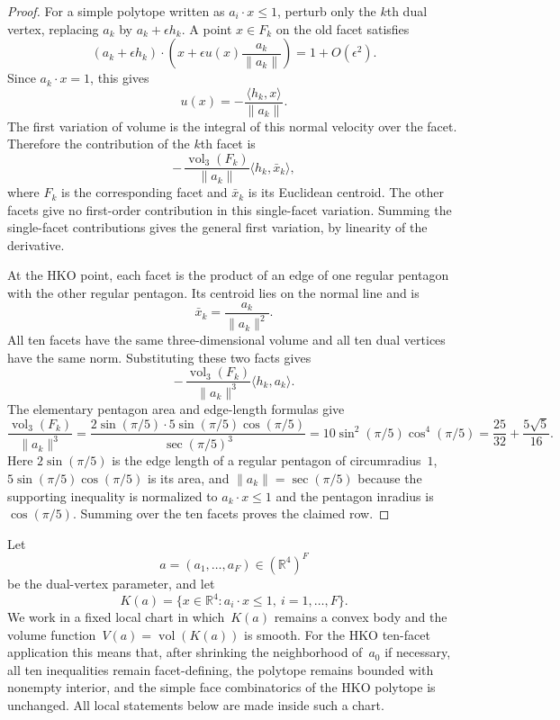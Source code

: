 \begin{proof}
For a simple polytope written as $a_i\cdot x\leq1$, perturb only the
$k$th dual vertex, replacing $a_k$ by $a_k+\epsilon h_k$.  A point
$x\in F_k$ on the old facet satisfies
\[
  (a_k+\epsilon h_k)\cdot
  \left(x+\epsilon u(x)\frac{a_k}{\|a_k\|}\right)
  =
  1+O(\epsilon^2).
\]
Since $a_k\cdot x=1$, this gives
\[
  u(x)=-\frac{\langle h_k,x\rangle}{\|a_k\|}.
\]
The first variation of volume is the integral of this normal velocity over
the facet.  Therefore the contribution of the $k$th facet is
\[
  -\,\frac{\operatorname{vol}_3(F_k)}{\|a_k\|}
  \langle h_k,\bar x_k\rangle,
\]
where $F_k$ is the corresponding facet and $\bar x_k$ is its Euclidean
centroid.  The other facets give no first-order contribution in this
single-facet variation.  Summing the single-facet contributions gives the
general first variation, by linearity of the derivative.

At the HKO point, each facet is the product of an edge of one
regular pentagon with the other regular pentagon.  Its centroid lies on the
normal line and is
\[
  \bar x_k=\frac{a_k}{\|a_k\|^2}.
\]
All ten facets have the same three-dimensional volume and all ten dual
vertices have the same norm.  Substituting these two facts gives
\[
  -\,\frac{\operatorname{vol}_3(F_k)}{\|a_k\|^3}
  \langle h_k,a_k\rangle.
\]
The elementary pentagon area and edge-length formulas give
\[
  \frac{\operatorname{vol}_3(F_k)}{\|a_k\|^3}
  =
  \frac{2\sin(\pi/5)\cdot 5\sin(\pi/5)\cos(\pi/5)}
       {\sec(\pi/5)^3}
  =
  10\sin^2(\pi/5)\cos^4(\pi/5)
  =
  \frac{25}{32}+\frac{5\sqrt{5}}{16}.
\]
Here $2\sin(\pi/5)$ is the edge length of a regular pentagon of
circumradius~$1$, $5\sin(\pi/5)\cos(\pi/5)$ is its area, and
$\|a_k\|=\sec(\pi/5)$ because the supporting inequality is normalized to
$a_k\cdot x\leq1$ and the pentagon inradius is~$\cos(\pi/5)$.
Summing over the ten facets proves the claimed row.
\end{proof}

Let
\[
  a=(a_1,\ldots,a_F)\in(\mathbb R^4)^F
\]
be the dual-vertex parameter, and let
\[
  K(a)=\{x\in\mathbb R^4: a_i\cdot x\leq 1,\ i=1,\ldots,F\}.
\]
We work in a fixed local chart in which~$K(a)$ remains a convex body and the
volume function~$V(a)=\operatorname{vol}(K(a))$ is smooth.
For the HKO ten-facet application this means that, after shrinking the
neighborhood of~$a_0$ if necessary, all ten inequalities remain
facet-defining, the polytope remains bounded with nonempty interior, and the
simple face combinatorics of the HKO polytope is unchanged.  All local
statements below are made inside such a chart.

